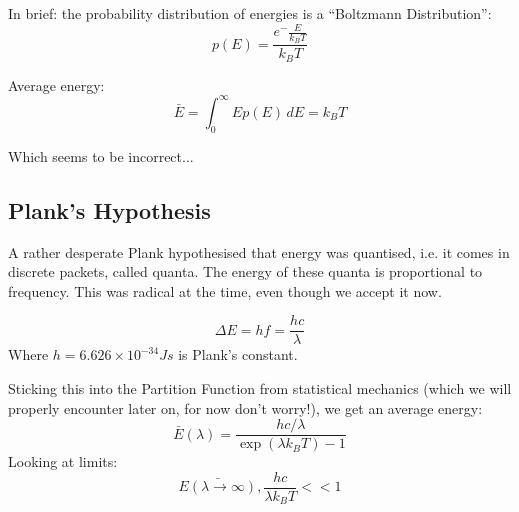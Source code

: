 In brief: the probability distribution of energies is a ``Boltzmann Distribution'':
\[
    p(E) = \frac{e^-{\frac{E}{k_B T}}}{k_B T}
\]

Average energy:
\[
    \bar{E} = \int_{0}^{\infty} E p (E) \, dE = k_B T
\]

Which seems to be incorrect...

\subsection*{Plank's Hypothesis}
A rather desperate Plank hypothesised that energy was quantised, i.e. it comes in discrete packets, called quanta. The energy of these quanta is proportional to frequency. This was radical at the time, even though we accept it now.

\[
    \Delta E = hf = \frac{hc}{\lambda}
\]
Where $h = 6.626 \times 10^{-34}Js$ is Plank's constant.

Sticking this into the Partition Function from statistical mechanics (which we will properly encounter later on, for now don't worry!), we get an average energy:
\[
    \bar{E}(\lambda) = \frac{hc/\lambda}{\exp(\lambda k_B T) - 1}
\]
Looking at limits:
\[
    \bar{E(\lambda \to \infty)}, \frac{hc}{\lambda k_BT} << 1
\]






